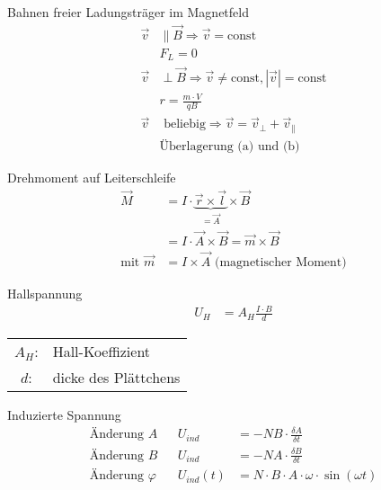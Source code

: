 \begin{karte}{Bahnen freier Ladungsträger im Magnetfeld}
    \begin{align*}
        \tag{a} \vec v &\| \vec B   \Rightarrow \vec v = \text{const}  \\
        & F_L = 0 \\
        \tag{b} \vec v &\perp \vec B  \Rightarrow \vec v \not= \text{const}, | \vec v | = \text{const}  \\
        &r = \tfrac{m \cdot V}{qB} \\
        \tag{c} \vec v & \text{ beliebig}  \Rightarrow \vec v = \vec v_\perp + \vec v_\| \\
        &\text{Überlagerung (a) und (b)}
    \end{align*}

\end{karte}

\begin{karte}{Drehmoment auf Leiterschleife}
    \begin{align*}
        \vec M &= I \cdot \underbrace{\vec r \times \vec l}_{=\vec A} \times \vec B \\
        &= I \cdot \vec A \times \vec B = \vec m \times \vec B \\
        \text{mit } \vec m &= I \times \vec A \text{ (magnetischer Moment)}
    \end{align*}
\end{karte}


\begin{karte}{Hallspannung}
    \begin{align*}
        U_H &= A_H \frac{I \cdot B}{d}
    \end{align*}
    \begin{tabular}[t]{cl}
        \( A_H \): & Hall-Koeffizient \\
        \( d \): & dicke des Plättchens \\
    \end{tabular}
\end{karte}


\begin{karte}{Induzierte Spannung}
    \begin{align*}
        \text{Änderung } A && U_{ind} &= -N B \cdot \frac{\delta A}{\delta t} \\
        \text{Änderung } B && U_{ind} &= -N A \cdot \frac{\delta B}{\delta t} \\
        \text{Änderung } \varphi && U_{ind}(t) &= N \cdot B \cdot A \cdot \omega \cdot \sin (\omega t)
    \end{align*}
\end{karte}

